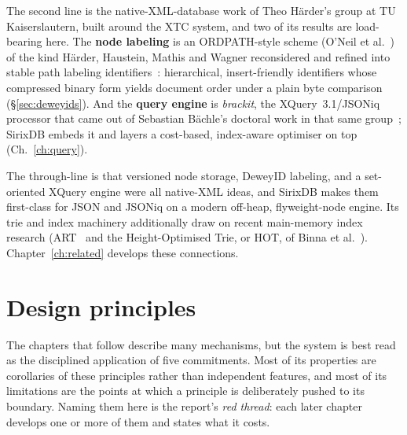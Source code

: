 \documentclass[11pt,a4paper,oneside]{report}
\theoremstyle{sirixthm}
\begin{document}
The second line is the native-XML-database work of Theo H\"arder's group at TU Kaiserslautern, built
around the XTC system, and two of its results are load-bearing here. The \textbf{node labeling} is an
ORDPATH-style scheme (O'Neil et al.~\cite{ordpath}) of the kind H\"arder, Haustein, Mathis and Wagner
reconsidered and refined into stable path labeling identifiers~\cite{haerderlabels}: hierarchical,
insert-friendly identifiers whose compressed binary form yields document order under a plain byte
comparison (\S\ref{sec:deweyids}). And the \textbf{query engine} is \emph{brackit}, the
XQuery~3.1/JSONiq processor that came out of Sebastian B\"achle's doctoral work in that same
group~\cite{baechle}; SirixDB embeds it and layers a cost-based, index-aware optimiser on top
(Ch.~\ref{ch:query}).

The through-line is that versioned node storage, DeweyID labeling, and a set-oriented XQuery engine were
all native-XML ideas, and SirixDB makes them first-class for JSON and JSONiq on a modern off-heap,
flyweight-node engine. Its trie and index machinery additionally draw on recent main-memory index
research (ART~\cite{leisart} and the Height-Optimised Trie, or HOT, of Binna et al.~\cite{binna}).
Chapter~\ref{ch:related} develops these connections.

\section{Design principles}
\label{sec:principles}

The chapters that follow describe many mechanisms, but the system is best read as the disciplined
application of five commitments. Most of its properties are corollaries of these principles rather than
independent features, and most of its limitations are the points at which a principle is deliberately
pushed to its boundary. Naming them here is the report's \emph{red thread}: each later chapter develops one
or more of them and states what it costs.
\end{document}
